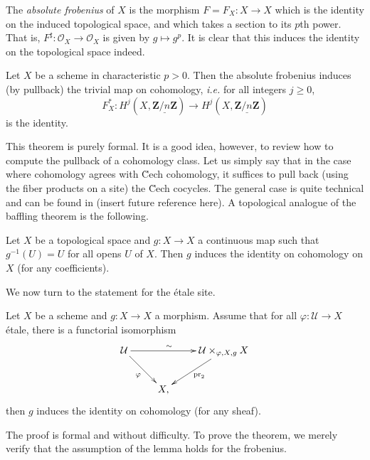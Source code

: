 \begin{definition}
The {\it absolute frobenius} of $X$ is the morphism $F = F_X : X \to X$ which 
is the identity on the induced topological space, and which takes a section to 
its $p$th power. That is, $F^\sharp : \mathcal{O}_X \to \mathcal{O}_X$ is given 
by $g \mapsto g^p$. It is clear that this induces the identity on the 
topological space indeed.
\end{definition}

\begin{theorem} \label{thm:TheBafflingTheorem}
Let $X$ be a scheme in characteristic $p>0$. Then the absolute frobenius 
induces (by pullback) the trivial map on cohomology, {\it i.e.} for all 
integers $j\geq 0$,
$$
F_X^* : H^j (X, \underline{\mathbf{Z}/n\mathbf{Z}}) \longrightarrow  H^j (X, 
\underline{\mathbf{Z}/n\mathbf{Z}})
$$
is the identity.
\end{theorem}

This theorem is purely formal. It is a good idea, however, to review how to 
compute the pullback of a cohomology class. Let us simply say that in the case 
where cohomology agrees with \u Cech cohomology, it suffices to pull back 
(using the fiber products on a site) the \u Cech cocycles. The general case is 
quite technical and can be found in (insert future reference here). A 
topological analogue of the baffling theorem is the following.

\begin{exercise}
Let $X$ be a topological space and $g : X \to X$ a continuous map such that 
$g^{-1}(U) = U$ for all opens $U$ of $X$. Then $g$ induces the identity on 
cohomology on $X$ (for any coefficients).
\end{exercise}

We now turn to the statement for the \'etale site.

\begin{lemma} \label{lem:FormalStuffForBafflingThm}
Let $X$ be a scheme and $g : X \to X$ a morphism. Assume that for all $\varphi: 
\mathcal{U} \to X$ \'etale, there is a functorial isomorphism 
$$
\xymatrix{
\mathcal{U} \ar_{\varphi}[rd] \ar^{\sim \quad}[rr] &&  {\mathcal{U} 
\times_{\varphi, X,g} X} \ar^{\text{pr}_2}[ld]\\
& X,
}
$$
then $g$ induces the identity on cohomology (for any sheaf). 
\end{lemma}

The proof is formal and without difficulty. To prove the theorem, we merely 
verify that the assumption of the lemma holds for the frobenius.

